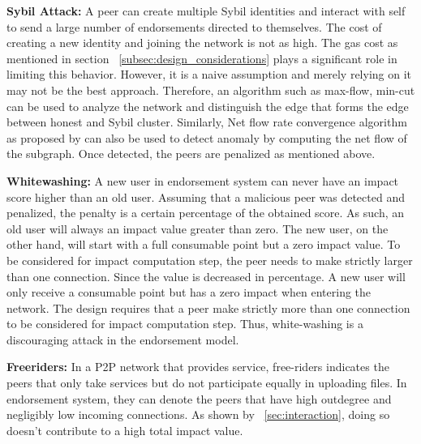 \textbf{Sybil Attack:}
A peer can create multiple Sybil identities and interact with self to send a
large number of endorsements directed to themselves. The cost of creating a new
identity and joining the network is not as high.  The gas cost as mentioned in
section ~\ref{subsec:design_considerations} plays a significant role in limiting this
behavior. However, it is a naive assumption and merely relying on it may not be
the best approach.  Therefore, an algorithm such as max-flow, min-cut can be
used to analyze the network and distinguish the edge that forms the edge
between honest and Sybil cluster. Similarly, Net flow rate convergence
algorithm as proposed by \cite{buechler2015decentralized} can also be used to
detect anomaly by computing the net flow of the subgraph. Once detected, the
peers are penalized as mentioned above.

\textbf{Whitewashing:}
A new user in endorsement system can never have an impact score higher than an
old user. Assuming that a malicious peer was detected and penalized, the
penalty is a certain percentage of the obtained score. As such, an old user
will always an impact value greater than zero. The new user, on the other hand,
will start with a full consumable point but a zero impact value. To be
considered for impact computation step, the peer needs to make strictly larger
than one connection.  Since the value is decreased in percentage. A new user
will only receive a consumable point but has a zero impact when entering the
network. The design requires that a peer make strictly more than one connection
to be considered for impact computation step. Thus, white-washing is a
discouraging attack in the endorsement model.

\textbf{Freeriders:}
In a P2P network that provides service, free-riders indicates the peers that
only take services but do not participate equally in uploading files. In
endorsement system, they can denote the peers that have high outdegree and
negligibly low incoming connections. As shown by ~\ref{sec:interaction}, doing
so doesn't contribute to a high total impact value.

